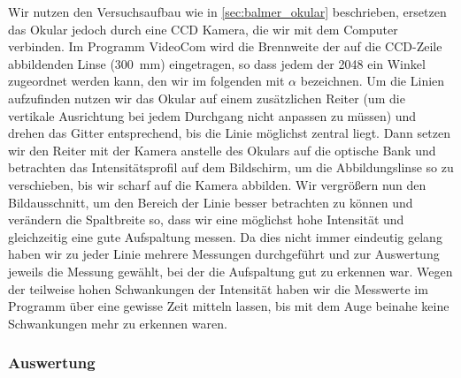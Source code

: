 \documentclass[11pt, a4paper]{article}
\numberwithin{equation}{section}
\begin{document}
Wir nutzen den Versuchsaufbau wie in \ref{sec:balmer_okular} beschrieben, ersetzen das Okular jedoch durch eine CCD Kamera, die wir mit dem Computer verbinden.
Im Programm VideoCom wird die Brennweite der auf die CCD-Zeile abbildenden Linse (\SI{300}{\milli\meter}) eingetragen, so dass jedem der 2048 ein Winkel zugeordnet werden kann, den wir im folgenden mit $\alpha$ bezeichnen.
Um die Linien aufzufinden nutzen wir das Okular auf einem zusätzlichen Reiter (um die vertikale Ausrichtung bei jedem Durchgang nicht anpassen zu müssen) und drehen das Gitter entsprechend, bis die Linie möglichst zentral liegt.
Dann setzen wir den Reiter mit der Kamera anstelle des Okulars auf die optische Bank und betrachten das Intensitätsprofil auf dem Bildschirm, um die Abbildungslinse so zu verschieben, bis wir scharf auf die Kamera abbilden.
Wir vergrößern nun den Bildausschnitt, um den Bereich der Linie besser betrachten zu können und verändern die Spaltbreite so, dass wir eine möglichst hohe Intensität und gleichzeitig eine gute Aufspaltung messen.
Da dies nicht immer eindeutig gelang haben wir zu jeder Linie mehrere Messungen durchgeführt und zur Auswertung jeweils die Messung gewählt, bei der die Aufspaltung gut zu erkennen war.
Wegen der teilweise hohen Schwankungen der Intensität haben wir die Messwerte im Programm über eine gewisse Zeit mitteln lassen, bis mit dem Auge beinahe keine Schwankungen mehr zu erkennen waren.

\subsubsection{Auswertung}
\end{document}
